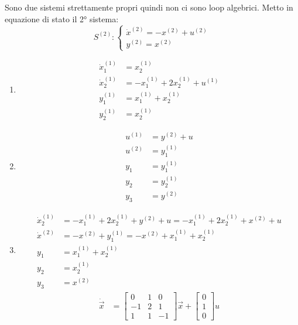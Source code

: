 \documentclass[../main.tex]{subfiles}
\begin{document}
\begin{Exercise}[title={Studiare propriet\'a di sistemi interconnessi}, difficulty=3]
				Sono due sistemi strettamente propri quindi non ci sono loop algebrici. Metto in equazione di stato il 2° sistema:
				\[
					S^{(2)}:
					\begin{cases}
						\dot x^{(2)} = -x^{(2)} + u^{(2)}\\
						y^{(2)} = x^{(2)}
					\end{cases}
				\]
				\begin{enumerate}
					\item 
						\begin{align*}
							\dot x^{(1)}_1 &= x^{(1)}_2\\
							\dot x^{(1)}_2 &= -x^{(1)}_1 + 2x^{(1)}_2 + u^{(1)}\\
							y^{(1)}_1 &= x^{(1)}_1 + x^{(1)}_2\\
							y^{(1)}_2 &= x^{(1)}_2
						\end{align*}
					\item 
						\begin{align*}
							u^{(1)} &= y^{(2)} + u\\
							u^{(2)} &= y^{(1)}_1\\
							y_1 &= y^{(1)}_1\\
							y_2 &= y^{(1)}_2\\
							y_3 &= y^{(2)}
						\end{align*}
					\item 
						\begin{align*}
							\dot x^{(1)}_2 &= -x^{(1)}_1 + 2x^{(1)}_2 + y^{(2)} + u = -x^{(1)}_1 + 2x^{(1)}_2 + x^{(2)} + u\\
							\dot x^{(2)} &= -x^{(2)} + y^{(1)}_1 = -x^{(2)} + x^{(1)}_1 + x^{(1)}_2\\
							y_1 &= x^{(1)}_1 + x^{(1)}_2\\
							y_2 &= x^{(1)}_2\\
							y_3 &= x^{(2)}
						\end{align*}
						\[
							\begin{aligned}
								\dot{\vec x} &= 
								\begin{bmatrix}
									0 & 1 & 0\\
									-1 & 2 & 1\\
									1 & 1 & -1
								\end{bmatrix} \vec x+
								\begin{bmatrix}
									0\\
									1\\
									0
								\end{bmatrix} u
								\\

\end{aligned}\]
\end{enumerate}
\end{Exercise}
\end{document}
